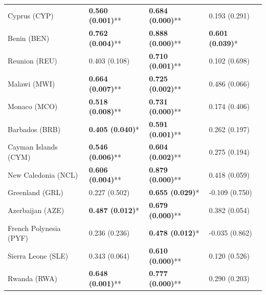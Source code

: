 \begin{longtable}{p{5cm}p{3cm}p{3cm}p{5cm}}
Cyprus (CYP) & \textcolor{atlLime600}{\textbf{0.560 (0.001)}**} & \textcolor{atlLime600}{\textbf{0.684 (0.000)}**} & \textcolor{atlOrange600}{0.193 (0.291)} \\
Benin (BEN) & \textcolor{atlLime600}{\textbf{0.762 (0.004)}**} & \textcolor{atlLime600}{\textbf{0.888 (0.000)}**} & \textcolor{atlLime600}{\textbf{0.601 (0.039)}*} \\
Reunion (REU) & \textcolor{atlOrange600}{0.403 (0.108)} & \textcolor{atlLime600}{\textbf{0.710 (0.001)}**} & \textcolor{atlOrange600}{0.102 (0.698)} \\
Malawi (MWI) & \textcolor{atlLime600}{\textbf{0.664 (0.007)}**} & \textcolor{atlLime600}{\textbf{0.725 (0.002)}**} & \textcolor{atlOrange600}{0.486 (0.066)} \\
Monaco (MCO) & \textcolor{atlLime600}{\textbf{0.518 (0.008)}**} & \textcolor{atlLime600}{\textbf{0.731 (0.000)}**} & \textcolor{atlOrange600}{0.174 (0.406)} \\
Barbados (BRB) & \textcolor{atlLime600}{\textbf{0.405 (0.040)}*} & \textcolor{atlLime600}{\textbf{0.591 (0.001)}**} & \textcolor{atlOrange600}{0.262 (0.197)} \\
Cayman Islands (CYM) & \textcolor{atlLime600}{\textbf{0.546 (0.006)}**} & \textcolor{atlLime600}{\textbf{0.604 (0.002)}**} & \textcolor{atlOrange600}{0.275 (0.194)} \\
New Caledonia (NCL) & \textcolor{atlLime600}{\textbf{0.606 (0.004)}**} & \textcolor{atlLime600}{\textbf{0.879 (0.000)}**} & \textcolor{atlOrange600}{0.418 (0.059)} \\
Greenland (GRL) & \textcolor{atlOrange600}{0.227 (0.502)} & \textcolor{atlLime600}{\textbf{0.655 (0.029)}*} & \textcolor{atlOrange600}{-0.109 (0.750)} \\
Azerbaijan (AZE) & \textcolor{atlLime600}{\textbf{0.487 (0.012)}*} & \textcolor{atlLime600}{\textbf{0.679 (0.000)}**} & \textcolor{atlOrange600}{0.382 (0.054)} \\
French Polynesia (PYF) & \textcolor{atlOrange600}{0.236 (0.236)} & \textcolor{atlLime600}{\textbf{0.478 (0.012)}*} & \textcolor{atlOrange600}{-0.035 (0.862)} \\
Sierra Leone (SLE) & \textcolor{atlOrange600}{0.343 (0.064)} & \textcolor{atlLime600}{\textbf{0.610 (0.000)}**} & \textcolor{atlOrange600}{0.120 (0.526)} \\
Rwanda (RWA) & \textcolor{atlLime600}{\textbf{0.648 (0.001)}**} & \textcolor{atlLime600}{\textbf{0.777 (0.000)}**} & \textcolor{atlOrange600}{0.290 (0.203)} \\

\end{longtable}
